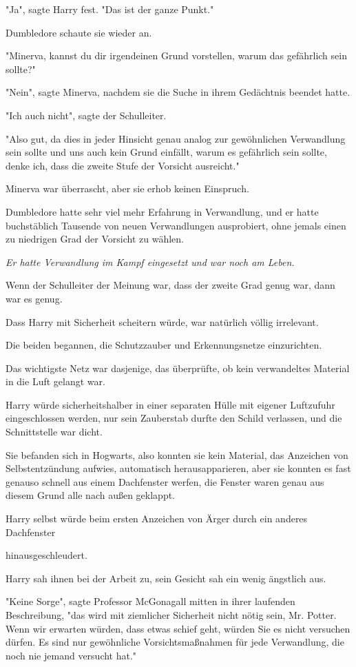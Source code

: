 {"Ja", sagte Harry fest. "Das ist der ganze Punkt."

Dumbledore schaute sie wieder an.

"Minerva, kannst du dir irgendeinen Grund vorstellen, warum das gefährlich sein sollte?"

"Nein", sagte Minerva, nachdem sie die Suche in ihrem Gedächtnis beendet hatte.

"Ich auch nicht", sagte der Schulleiter.

"Also gut, da dies in jeder Hinsicht genau analog zur gewöhnlichen Verwandlung sein sollte und uns auch kein Grund einfällt, warum es gefährlich sein sollte, denke ich, dass die zweite Stufe der Vorsicht ausreicht."

Minerva war überrascht, aber sie erhob keinen Einspruch.

Dumbledore hatte sehr viel mehr Erfahrung in Verwandlung, und er hatte buchstäblich Tausende von neuen Verwandlungen ausprobiert, ohne jemals einen zu niedrigen Grad der Vorsicht zu wählen.

\emph{Er hatte Verwandlung im Kampf eingesetzt und war noch am Leben.}

Wenn der Schulleiter der Meinung war, dass der zweite Grad genug war, dann war es genug.

Dass Harry mit Sicherheit scheitern würde, war natürlich völlig irrelevant.

Die beiden begannen, die Schutzzauber und Erkennungsnetze einzurichten.

Das wichtigste Netz war dasjenige, das überprüfte, ob kein verwandeltes Material in die Luft gelangt war.

Harry würde sicherheitshalber in einer separaten Hülle mit eigener Luftzufuhr eingeschlossen werden, nur sein Zauberstab durfte den Schild verlassen, und die Schnittstelle war dicht.

Sie befanden sich in Hogwarts, also konnten sie kein Material, das Anzeichen von Selbstentzündung aufwies, automatisch herausapparieren, aber sie konnten es fast genauso schnell aus einem Dachfenster werfen, die Fenster waren genau aus diesem Grund alle nach außen geklappt.

Harry selbst würde beim ersten Anzeichen von Ärger durch ein anderes Dachfenster

hinausgeschleudert.

Harry sah ihnen bei der Arbeit zu, sein Gesicht sah ein wenig ängstlich aus.

"Keine Sorge", sagte Professor McGonagall mitten in ihrer laufenden Beschreibung, "das wird mit ziemlicher Sicherheit nicht nötig sein, Mr. Potter. Wenn wir erwarten würden, dass etwas schief geht, würden Sie es nicht versuchen dürfen. Es sind nur gewöhnliche Vorsichtsmaßnahmen für jede Verwandlung, die noch nie jemand versucht hat."

}
